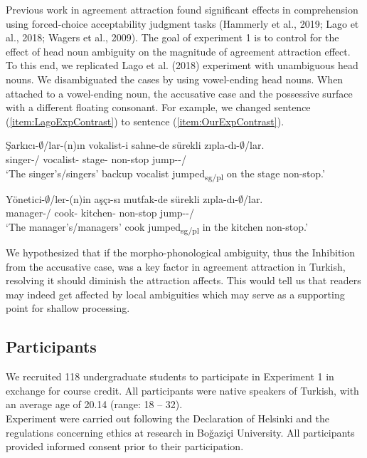 \documentclass[
  english,
  doc,floatsintext]{apa6}
\begin{document}
Previous work in agreement attraction found significant effects in comprehension using forced-choice acceptability judgment tasks (Hammerly et al., 2019; Lago et al., 2018; Wagers et al., 2009). The goal of experiment 1 is to control for the effect of head noun ambiguity on the magnitude of agreement attraction effect. To this end, we replicated Lago et al. (2018) experiment with unambiguous head nouns. We disambiguated the cases by using vowel-ending head nouns. When attached to a vowel-ending noun, the accusative case and the possessive surface with a different floating consonant. For example, we changed sentence (\ref{item:LagoExpContrast}) to sentence (\ref{item:OurExpContrast}).

\begin{exe}
\ex \label{item:LagoExpContrast}
\gll Şarkıcı-$\emptyset$/lar-(n)ın vokalist-i sahne-de sürekli zıpla-dı-$\emptyset$/lar.\\
singer-\Sg{}/\Pl{}\Gen{} vocalist-\Poss{} stage-\Loc{} non-stop jump-\Pst{}-\Sg{}/\Pl{}\\
\glt `The singer's/singers' backup vocalist jumped\textsubscript{sg/pl} on the stage non-stop.'

\ex \label{item:OurExpContrast}
\gll Yönetici-$\emptyset$/ler-(n)in aşçı-sı mutfak-de sürekli zıpla-dı-$\emptyset$/lar.\\
manager-\Sg{}/\Pl{}\Gen{} cook-\Poss{} kitchen-\Loc{} non-stop jump-\Pst{}-\Sg{}/\Pl{}\\
\glt `The manager's/managers' cook jumped\textsubscript{sg/pl} in the kitchen non-stop.'
\end{exe}

We hypothesized that if the morpho-phonological ambiguity, thus the Inhibition from the accusative case, was a key factor in agreement attraction in Turkish, resolving it should diminish the attraction affects. This would tell us that readers may indeed get affected by local ambiguities which may serve as a supporting point for shallow processing.

\hypertarget{participants}{%
\subsection{Participants}\label{participants}}

We recruited 118 undergraduate students to participate in Experiment 1 in exchange for course credit. All participants were native speakers of Turkish, with an average age of 20.14 (range: 18 -- 32).\\
Experiment were carried out following the Declaration of Helsinki and the regulations concerning ethics at research in Bo\u{g}azi\c{c}i University. All participants provided informed consent prior to their participation.
\end{document}
